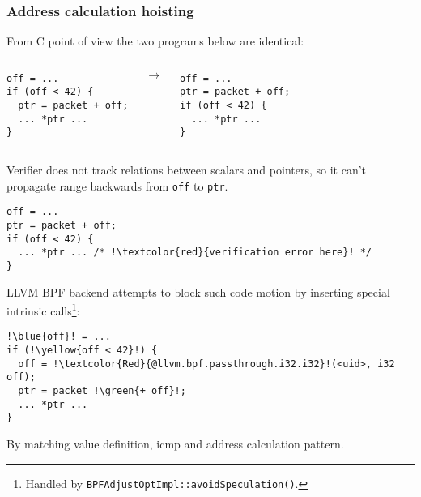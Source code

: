 \documentclass{beamer}
\newcommand{\code}[1]{\texttt{#1}}
\newcommand{\marker}[2]{\colorbox{#1}{#2}}
\newcommand{\green }[1]{\marker{SpringGreen!40}{#1}}
\newcommand{\yellow}[1]{\marker{Goldenrod!40}{#1}}
\newcommand{\blue  }[1]{\marker{SkyBlue!40}{#1}}
\begin{document}
\begin{frame}
  \frametitle{Address calculation hoisting}

  From C point of view the two programs below are identical:
  \vspace{0.5cm}

  \begin{columns}
    \begin{minipage}{\textwidth}
      \begin{verbatim}
off = ...
if (off < 42) {
  ptr = packet + off;
  ... *ptr ...
}
      \end{verbatim}
    \end{minipage}
    $\rightarrow$
    \begin{minipage}{\textwidth}
      \begin{verbatim}
off = ...
ptr = packet + off;
if (off < 42) {
  ... *ptr ...
}
      \end{verbatim}
    \end{minipage}
  \end{columns}

  \framebreak

Verifier does not track relations between scalars and pointers, so it
can't propagate range backwards from \code{off} to \code{ptr}.

  \begin{verbatim}
off = ...
ptr = packet + off;
if (off < 42) {
  ... *ptr ... /* !\textcolor{red}{verification error here}! */
}
  \end{verbatim}

  \framebreak

LLVM BPF backend attempts to block such code motion by inserting
special intrinsic calls\footnote{\tiny{Handled by \code{BPFAdjustOptImpl::avoidSpeculation()}.}}:

  \begin{verbatim}
!\blue{off}! = ...
if (!\yellow{off < 42}!) {
  off = !\textcolor{Red}{@llvm.bpf.passthrough.i32.i32}!(<uid>, i32 off);
  ptr = packet !\green{+ off}!;
  ... *ptr ...
}
  \end{verbatim}

By matching value \blue{definition}, \yellow{icmp} and \green{address calculation} pattern.

\end{frame}
\end{document}
